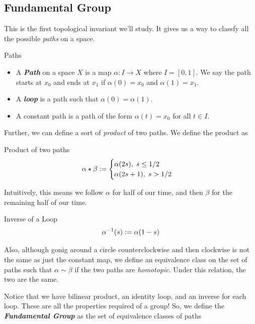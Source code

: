 \documentclass{article}
\newcommand{\defeq}{\vcentcolon=}
\begin{document}
\vskip 1cm
\subsection{Fundamental Group}

\vskip 0.25cm
This is the first topological invariant we'll study. It gives us a way to classfy all the possible \emph{paths} on a space.

\begin{mathdefinitionbox}{Paths}
  \begin{itemize}
    \item A \emph{\textbf{Path}} on a space $X$ is a map $\alpha : I \rightarrow X$ where $I = [0, 1]$. We say the path starts at $x_0$ and ends at $x_1$ if $\alpha(0) = x_0$ and $\alpha(1) = x_1$.
    \item A \emph{\textbf{loop}} is a path such that $\alpha(0) = \alpha(1)$.
    \item A constant path is a path of the form $\alpha(t) = x_0$ for all $t \in I$.
  \end{itemize}
\end{mathdefinitionbox}

\vskip 0.25cm
Further, we can define a sort of \emph{product} of two paths. We define the product as 

\begin{mathdefinitionbox}{Product of two paths}
  \[ \alpha \star \beta \defeq \begin{cases}
    \alpha(2s), \;s \leq 1/2 \\
    \alpha(2s+1), \;s > 1/2 \\
  \end{cases} \]
\end{mathdefinitionbox}

\vskip 0.25cm
Intuitively, this means we follow $\alpha$ for half of our time, and then $\beta$ for the remaining half of our time.

\vskip 0.25cm
\begin{mathdefinitionbox}{Inverse of a Loop} 
  \[ \alpha^{-1}(s) \defeq \alpha(1-s) \]
\end{mathdefinitionbox}

\vskip 0.25cm
Also, although gonig around a circle counterclockwise and then clockwise is not the same as just the constant map, we define an equivalence class on the set of paths such that $\alpha \sim \beta$ if the two paths are \emph{homotopic}. Under this relation, the two are the same.

\vskip 0.25cm
Notice that we have bilinear product, an identity loop, and an inverse for each loop. These are all the properties required of a group! So, we define the \emph{\textbf{Fundamental Group}} as the set of equivalence classes of paths
\end{document}

